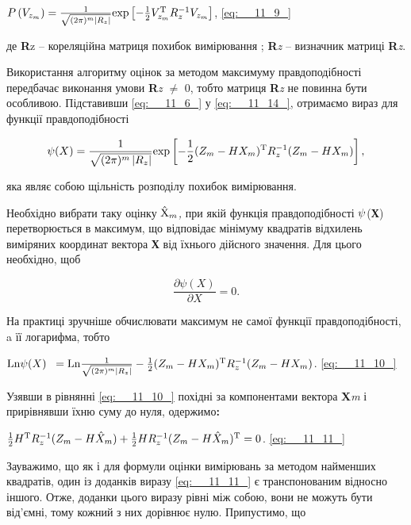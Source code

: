 $P\left(V_{z_{m} } \right)=\frac{1}{\sqrt{(2{\rm \pi })^{m} \left|R_{z} \right|} 
} {\rm exp}\left[-\frac{1}{2} V_{z_{m} }^{{\rm T}} R_{z}^{-1} V_{z_{m} } \right]$,           
\eqref{eq:__11_9_}

де\textit{ }\textbf{R}z -- кореляційна матриця похибок вимірювання ; \textbar \textbf{R}\textit{z} \textbar  
-- визначник матриці \textbf{R}\textit{z}.                                                   

Використання 
алгоритму оцінок за методом максимуму правдоподібності передбачає виконання умови 
\textbar \textbf{R}\textit{z} \textbar  $\neq$ 0, тобто матриця \textbf{R}\textit{z }не 
повинна бути особливою. Підставивши \eqref{eq:__11_6_} у \eqref{eq:__11_14_}, 
отримаємо вираз для функції правдоподібності 

\[\psi (X)=\frac{1}{\sqrt{(2\pi )^{m} \left|R_{z} \right|} } {\rm exp}\left[-\frac{1}{2} 
(Z_{m} -HX_{m} )^{{\rm T}} R_{z}^{-1} (Z_{m} -HX_{m} )\right],\] 

яка являє собою щільність розподілу похибок  вимірювання.

Необхідно вибрати таку оцінку \textit{ }$\hat{{\rm X} }_{m} $\textit{,} при якій 
функція правдоподібності ${\rm \psi }$(\textbf{Х}) перетворюється в максимум, що 
відповідає мінімуму квадратів відхилень виміряних координат вектора \textbf{Х} від 
їхнього дійсного значення. Для цього необхідно, щоб           

\[\frac{\partial \psi (X)}{\partial X} =0.\] 

На практиці зручніше обчислювати максимум не самої функції правдоподібності, a її 
логарифма, тобто

${\rm Ln}{\rm \psi }(X){\rm \; \; }={\rm Ln}\frac{1}{\sqrt{(2{\rm \pi })^{m} \left|R_{z} 
\right|} } -\frac{1}{2} (Z_{m} -HX_{m} )^{{\rm T}} R_{z}^{-1} (Z_{m} -HX_{m} )$.   
\eqref{eq:__11_10_}     

Узявши в рівнянні \eqref{eq:__11_10_} похідні за компонентами вектора \textbf{X}\textit{m} і 
прирівнявши\textbf{ }їхню суму до нуля, одержимо\textbf{:}

\textit{$\frac{1}{2} H^{{\rm T}} R_{z}^{-1} (Z_{m} -H\hat{X}_{m} )+\frac{1}{2} HR_{z}^{-1} 
(Z_{m} -H\hat{X}_{m} )^{{\rm T}} =0$}.        \eqref{eq:__11_11_}

Зауважимо, що як і для формули оцінки вимірювань за методом найменших квадратів, 
один із доданків виразу \eqref{eq:__11_11_} є транспонованим відносно іншого. 
Отже, доданки цього виразу рівні між собою, вони не можуть бути від'ємні, тому кожний 
з них дорівнює нулю. Припустимо, що                    

